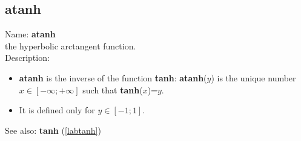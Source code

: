 \subsection{atanh}
\label{labatanh}
\noindent Name: \textbf{atanh}\\
the hyperbolic arctangent function.\\
\noindent Description: \begin{itemize}

\item \textbf{atanh} is the inverse of the function \textbf{tanh}: \textbf{atanh}($y$) is the unique number 
   $x \in [-\infty; +\infty]$ such that \textbf{tanh}($x$)=$y$.

\item It is defined only for $y \in [-1; 1]$.
\end{itemize}
See also: \textbf{tanh} (\ref{labtanh})
